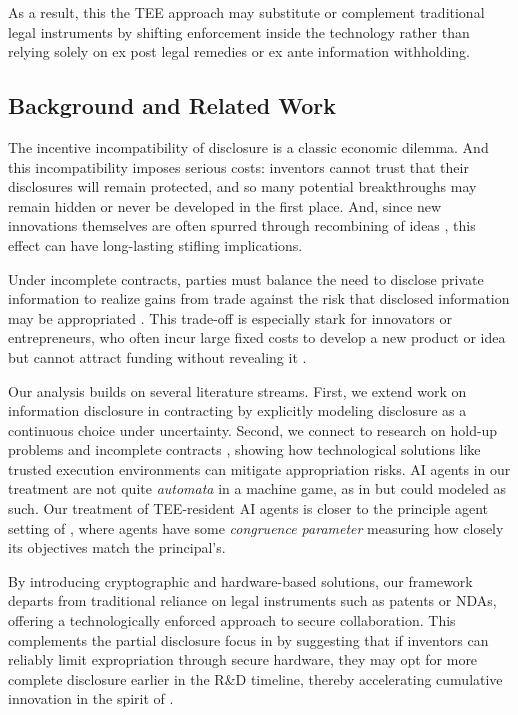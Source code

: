 \documentclass{article}
\begin{document}
As a result, this the TEE approach may substitute or complement traditional legal instruments by shifting enforcement inside the technology rather than relying solely on ex post legal remedies or ex ante information withholding.

\subsection{Background and Related Work}

The incentive incompatibility of disclosure is a classic economic dilemma. And this incompatibility imposes serious costs: inventors cannot trust that their disclosures will remain protected, and so many potential breakthroughs may remain hidden or never be developed in the first place. And, since new innovations themselves are often spurred through recombining of ideas \citep{fleming2001recombinant}, this effect can have long-lasting stifling implications.

Under incomplete contracts, parties must balance the need to disclose private information to realize gains from trade against the risk that disclosed information may be appropriated \citep{arrow1972economic}. This trade-off is especially stark for innovators or entrepreneurs, who often incur large fixed costs to develop a new product or idea but cannot attract funding without revealing it \citep{nelson1959simple}. 

Our analysis builds on several literature streams. First, we extend work on information disclosure in contracting \citep{crawford1982strategic, okuno1991incentive} by explicitly modeling disclosure as a continuous choice under uncertainty. Second, we connect to research on hold-up problems and incomplete contracts \citep{hart1988incomplete, aghion1992innovation, grossman1986disclosure, bernheim1987sequential, anton1994expropriation}, showing how technological solutions like trusted execution environments can mitigate appropriation risks.  AI agents in our treatment are not quite \emph{automata} in a machine game, as in \citet{rubinstein1986finite} but could modeled as such. Our treatment of TEE-resident AI agents is closer to the principle agent setting of \citet{aghion1997formal}, where agents have some \emph{congruence parameter} measuring how closely its objectives match the principal’s.

By introducing cryptographic and hardware-based solutions, our framework departs from traditional reliance on legal instruments such as patents or NDAs, offering a technologically enforced approach to secure collaboration. This complements the partial disclosure focus in \citet{anton1994expropriation, anton2002sale} by suggesting that if inventors can reliably limit expropriation through secure hardware, they may opt for more complete disclosure earlier in the R\&D timeline, thereby accelerating cumulative innovation in the spirit of \citet{Scotchmer1999}.
\end{document}
